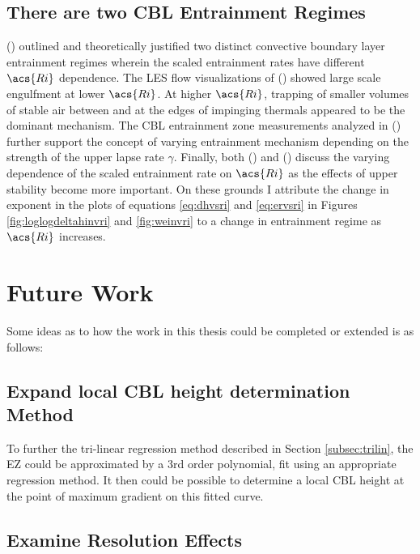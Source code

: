 \subsection{There are two \acs{CBL} Entrainment Regimes}

\citeauthor{Turner86} (\citeyear{Turner86}) outlined and theoretically justified two distinct convective boundary layer entrainment regimes wherein the scaled entrainment rates have different $\acs{Ri}$ dependence. The \acs{LES} flow visualizations of \citeauthor{SullMoengStev} (\citeyear{SullMoengStev}) showed large scale engulfment at lower $\acs{Ri}$.  At higher $\acs{Ri}$, trapping of smaller volumes of stable air between and at the edges of impinging thermals appeared to be the dominant mechanism. The \acs{CBL} entrainment zone measurements analyzed in \citeauthor{Traum11} (\citeyear{Traum11}) further support the concept of varying entrainment mechanism depending on the strength of the upper lapse rate $\gamma$.  Finally, both \citeauthor{FedConzMir04} (\citeyear{FedConzMir04})  and \citeauthor{GarciaMellado} (\citeyear{GarciaMellado}) discuss the varying dependence of the scaled entrainment rate on $\acs{Ri}$ as the effects of upper stability become more important.  On these grounds I attribute the change in exponent in the plots of equations \ref{eq:dhvsri} and \ref{eq:ervsri} in Figures \ref{fig:loglogdeltahinvri} and \ref{fig:weinvri} to a change in entrainment regime as $\acs{Ri}$ increases.   


\section{Future Work}

Some ideas as to how the work in this thesis could be completed or extended is as follows:

\subsection{Expand local \acs{CBL} height determination Method}

To further the tri-linear regression method described in Section \ref{subsec:trilin}, the \acs{EZ} could be approximated by a 3rd order polynomial, fit using an appropriate regression method.  It then could be possible to determine a local \acs{CBL} height at the point of maximum gradient on this fitted curve.\\

\subsection{Examine Resolution Effects}

